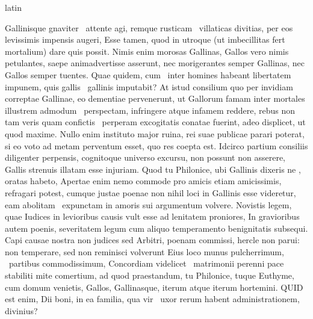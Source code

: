 \documentclass[12pt]{book}
\renewenvironment{latin}
    	{\begin{hyphenrules}{latin}}
    	{\end{hyphenrules}}
\begin{document}
\begin{pages}
\begin{latin}
\begin{Leftside}
                        Gallinisque gnaviter ﻿\ampersand\ attente agi, remque rusticam ﻿\ampersand\ villaticas divitias, per eos levissimis impensis augeri, 
                        Esse tamen, quod in utroque (ut imbecillitas fert mortalium)  dare quis possit. 
                        Nimis enim morosas Gallinas, Gallos vero nimis petulantes, saepe animadvertisse asserunt, nec morigerantes semper Gallinas, nec Gallos semper tuentes. 
                        Quae quidem, cum ﻿\ampersand\ inter homines habeant libertatem impunem, quis gallis ﻿\ampersand\ gallinis imputabit? 
                        At istud consilium quo per invidiam correptae Gallinae, eo dementiae pervenerunt, 
                        ut Gallorum famam inter mortales illustrem admodum ﻿\ampersand\ perspectam, 
                        infringere atque infamem reddere, rebus non tam veris quam confictis ﻿\ampersand\ perperam excogitatis conatae fuerint, adeo displicet, 
                        ut quod maxime. 
                        Nullo enim instituto major ruina, rei suae publicae parari poterat, si eo voto ad metam perventum esset, quo res coepta est. 
                        Idcirco partium consiliis diligenter perpensis, cognitoque universo  excursu, non possunt non asserere, Gallis strenuis illatam esse injuriam. 
                        Quod tu Philonice, ubi Gallinis dixeris ne , oratas habeto, 
                        Apertae enim  nemo commode pro   amicis etiam amicissimis, refragari potest, cumque justae poenae non nihil loci in Gallinis esse videretur, 
                        eam abolitam ﻿\ampersand\ expunctam in amoris sui argumentum volvere. 
                        Novistis legem, quae Iudices in levioribus causis vult esse ad lenitatem proniores, 
                        In gravioribus autem poenis, severitatem legum cum aliquo temperamento benignitatis subsequi. 
                        Capi causae nostra non judices sed Arbitri, poenam commissi, hercle non parui: 
                        non temperare, sed non reminisci volverunt Eius loco munus  pulcherrimum, ﻿\ampersand\ partibus commodissimum, 
                        Concordiam videlicet ﻿\ampersand\ matrimonii perenni pace stabiliti mite comertium, 
                        ad quod praestandum, tu Philonice, tuque Euthyme, cum domum venietis, Gallos, Gallinasque, iterum atque iterum hortemini. 
                        QUID est enim, Dii boni, in ea familia, qua vir ﻿\ampersand\ uxor rerum habent administrationem, divinius? 

\end{Leftside}
\end{latin}
\end{pages}
\end{document}
